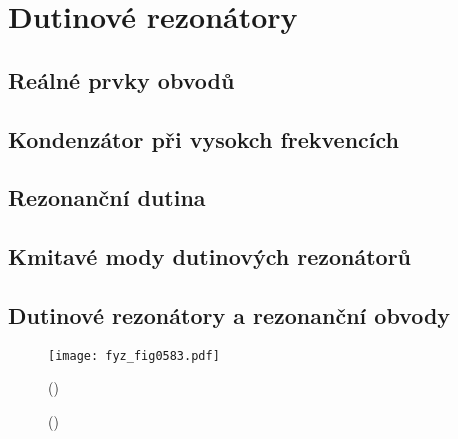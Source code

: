 \setchaptertoc
\chapter{Dutinové rezonátory}\label{fyz:IIchapXXIII}

\section{Reálné prvky obvodů}\label{fyz:IIchapXXIIIsecI}
\section{Kondenzátor při vysokch frekvencích}\label{fyz:IIchapXXIIIsecII}
\section{Rezonanční dutina}\label{fyz:IIchapXXIIIsecIII}
\section{Kmitavé mody dutinových rezonátorů}\label{fyz:IIchapXXIIIsecIV}
\section{Dutinové rezonátory a rezonanční obvody}\label{fyz:IIchapXXIIIsecV}

    \begin{figure}[ht!] %
      \centering
      \texttt{[image: fyz\_fig0583.pdf]}
      \caption{
               (\cite[s.~707]{Feynman02})}
      \label{fyz:fig0583}
    \end{figure}

    \begin{figure}[ht!]
      \centering
      \caption{
               (\cite[s.~748]{Feynman02})}
      \label{fyz:fig0584}
    \end{figure}

